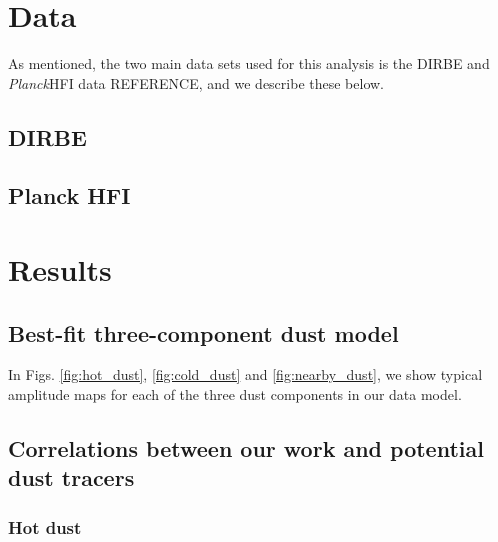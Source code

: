 \documentclass{aa}
\def\Planck{\textit{Planck}}
\begin{document}
\clearpage
\section{Data}
As mentioned, the two main data sets used for this analysis is the DIRBE and \Planck HFI data REFERENCE, and we describe these below.
\subsection{DIRBE}

\subsection{Planck HFI}
\clearpage
\section{Results}

\subsection{Best-fit three-component dust model}
In Figs. \ref{fig:hot_dust}, \ref{fig:cold_dust} and \ref{fig:nearby_dust}, we show typical amplitude maps for each of the three dust components in our data model.


\subsection{Correlations between our work and potential dust tracers}
\subsubsection{Hot dust}
\end{document}
